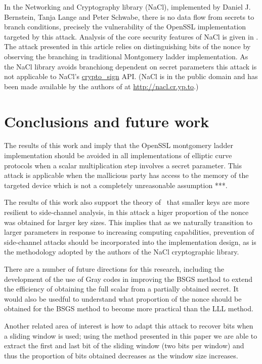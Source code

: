 \documentclass{llncs}
\begin{document}
In the Networking and Cryptography library (NaCl), implemented by Daniel J. Bernstein, Tanja Lange and Peter Schwabe, there is no data flow from secrets to branch conditions, precisely the vulnerability of the OpenSSL implementation targeted by this attack. Analysis of the core security features of NaCl is given in \cite{dan-tan-peter} . The attack presented in this article relies on distinguishing bits of the nonce by observing the branching in traditional Montgomery ladder implementation. As the NaCl library avoids branchiong dependent on secret parameters this attack is not applicable to NaCl's \url{crypto_sign} API. (NaCl is in the public domain and has been made available by the authors of \cite{dan-tan-peter} at \url{http://nacl.cr.yp.to}.)


\section{Conclusions and future work}
The results of this work and \cite{brumley11remote} imply that the OpenSSL montgomery ladder implementation should be avoided in all implementations of elliptic curve protocols when a scalar multiplication step involves a secret parameter. This attack is applicable when the mallicious party has access to the memory of the targeted device which is not a completely unreasonable assumption ***. 

The results of this work also support the theory of~\cite{walter04longer} that smaller keys are more resilient to side-channel analysis, in this attack a higer proportion of the nonce was obtained for larger key sizes. This implies that as we naturally transition to larger parameters in response to increasing computing capabilities, prevention of side-channel attacks should be incorporated into the implementation design, as is the methodology adopted by the authors of the NaCl cryptographic library. 

There are a number of future directions for this research, including the development of the use of Gray codes in improving the BSGS method to extend the efficiency of obtaining the full scalar from a partially obtained secret. It would also be usedful to understand what proportion of the nonce should be obtained for the BSGS method to become more practical than the LLL method. 

Another related area of interest is how to adapt this attack to recover bits when a sliding window is used; using the method presented in this paper we are able to extract the first and last bit of the sliding window (two bits per window) and thus the proportion of bits obtained decreases as the window size increases. 
\end{document}
